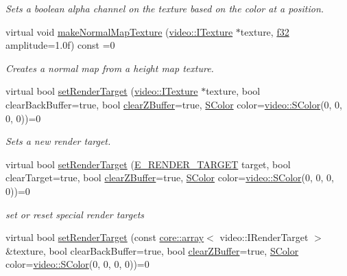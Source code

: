 \begin{DoxyCompactItemize}
\begin{DoxyCompactList}\small\item\em Sets a boolean alpha channel on the texture based on the color at a position. \end{DoxyCompactList}\item 
virtual void \hyperlink{classirr_1_1video_1_1IVideoDriver_a6470e31c1aaf2c0fa5e5a5b3f8f092e0}{make\+Normal\+Map\+Texture} (\hyperlink{classirr_1_1video_1_1ITexture}{video\+::\+I\+Texture} $\ast$texture, \hyperlink{namespaceirr_a0277be98d67dc26ff93b1a6a1d086b07}{f32} amplitude=1.\+0f) const =0
\begin{DoxyCompactList}\small\item\em Creates a normal map from a height map texture. \end{DoxyCompactList}\item 
virtual bool \hyperlink{classirr_1_1video_1_1IVideoDriver_a8c38a8d8d6d49be53bda55eb0749e7eb}{set\+Render\+Target} (\hyperlink{classirr_1_1video_1_1ITexture}{video\+::\+I\+Texture} $\ast$texture, bool clear\+Back\+Buffer=true, bool \hyperlink{classirr_1_1video_1_1IVideoDriver_a2036fe0a27dbd1a123ff5aedb07373a5}{clear\+Z\+Buffer}=true, \hyperlink{classirr_1_1video_1_1SColor}{S\+Color} color=\hyperlink{classirr_1_1video_1_1SColor}{video\+::\+S\+Color}(0, 0, 0, 0))=0
\begin{DoxyCompactList}\small\item\em Sets a new render target. \end{DoxyCompactList}\item 
virtual bool \hyperlink{classirr_1_1video_1_1IVideoDriver_ad75e7606ab186f1e31cc126bcaaeba9c}{set\+Render\+Target} (\hyperlink{namespaceirr_1_1video_a5b61a3f2bd5d458f76f2eb20b0f40972}{E\+\_\+\+R\+E\+N\+D\+E\+R\+\_\+\+T\+A\+R\+G\+ET} target, bool clear\+Target=true, bool \hyperlink{classirr_1_1video_1_1IVideoDriver_a2036fe0a27dbd1a123ff5aedb07373a5}{clear\+Z\+Buffer}=true, \hyperlink{classirr_1_1video_1_1SColor}{S\+Color} color=\hyperlink{classirr_1_1video_1_1SColor}{video\+::\+S\+Color}(0, 0, 0, 0))=0
\begin{DoxyCompactList}\small\item\em set or reset special render targets \end{DoxyCompactList}\item 
\mbox{\label{classirr_1_1video_1_1IVideoDriver_a1e2bd871ef54ae9bf16c3a49b318d777}} 
virtual bool \hyperlink{classirr_1_1video_1_1IVideoDriver_a1e2bd871ef54ae9bf16c3a49b318d777}{set\+Render\+Target} (const \hyperlink{classirr_1_1core_1_1array}{core\+::array}$<$ video\+::\+I\+Render\+Target $>$ \&texture, bool clear\+Back\+Buffer=true, bool \hyperlink{classirr_1_1video_1_1IVideoDriver_a2036fe0a27dbd1a123ff5aedb07373a5}{clear\+Z\+Buffer}=true, \hyperlink{classirr_1_1video_1_1SColor}{S\+Color} color=\hyperlink{classirr_1_1video_1_1SColor}{video\+::\+S\+Color}(0, 0, 0, 0))=0

\end{DoxyCompactItemize}
